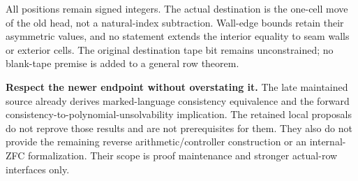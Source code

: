 All positions remain signed integers. The actual destination is the one-cell move of the old head, not a natural-index subtraction. Wall-edge bounds retain their asymmetric values, and no statement extends the interior equality to seam walls or exterior cells. The original destination tape bit remains unconstrained; no blank-tape premise is added to a general row theorem.

\textbf{Respect the newer endpoint without overstating it.} The late maintained source already derives marked-language consistency equivalence and the forward consistency-to-polynomial-unsolvability implication. The retained local proposals do not reprove those results and are not prerequisites for them. They also do not provide the remaining reverse arithmetic/controller construction or an internal-ZFC formalization. Their scope is proof maintenance and stronger actual-row interfaces only.
